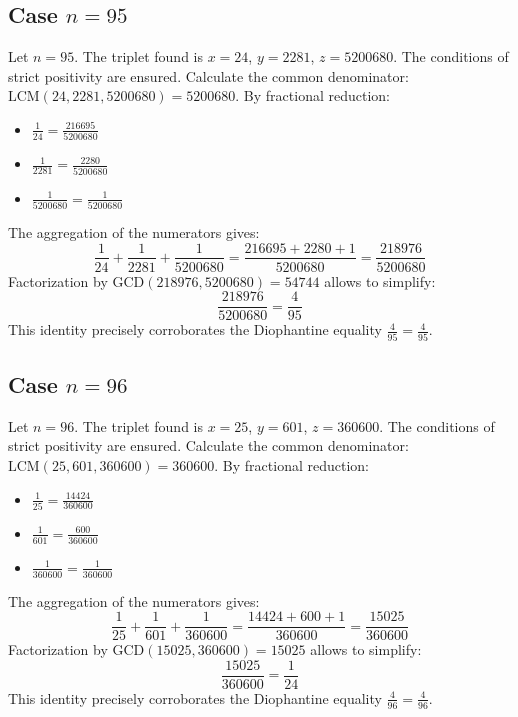 \documentclass[11pt,a4paper]{article}
\begin{document}
\subsection{Case $n = 95$}
Let $n = 95$. The triplet found is $x = 24$, $y = 2281$, $z = 5200680$.
The conditions of strict positivity are ensured.
Calculate the common denominator: $\text{LCM}(24, 2281, 5200680) = 5200680$.
By fractional reduction:
\begin{itemize}
    \item $\frac{1}{24} = \frac{216695}{5200680}$
    \item $\frac{1}{2281} = \frac{2280}{5200680}$
    \item $\frac{1}{5200680} = \frac{1}{5200680}$
\end{itemize}
The aggregation of the numerators gives:
$$ \frac{1}{24} + \frac{1}{2281} + \frac{1}{5200680} = \frac{216695 + 2280 + 1}{5200680} = \frac{218976}{5200680} $$
Factorization by $\text{GCD}(218976, 5200680) = 54744$ allows to simplify:
$$ \frac{218976}{5200680} = \frac{4}{95} $$
This identity precisely corroborates the Diophantine equality $\frac{4}{95} = \frac{4}{95}$.

\subsection{Case $n = 96$}
Let $n = 96$. The triplet found is $x = 25$, $y = 601$, $z = 360600$.
The conditions of strict positivity are ensured.
Calculate the common denominator: $\text{LCM}(25, 601, 360600) = 360600$.
By fractional reduction:
\begin{itemize}
    \item $\frac{1}{25} = \frac{14424}{360600}$
    \item $\frac{1}{601} = \frac{600}{360600}$
    \item $\frac{1}{360600} = \frac{1}{360600}$
\end{itemize}
The aggregation of the numerators gives:
$$ \frac{1}{25} + \frac{1}{601} + \frac{1}{360600} = \frac{14424 + 600 + 1}{360600} = \frac{15025}{360600} $$
Factorization by $\text{GCD}(15025, 360600) = 15025$ allows to simplify:
$$ \frac{15025}{360600} = \frac{1}{24} $$
This identity precisely corroborates the Diophantine equality $\frac{4}{96} = \frac{4}{96}$.
\end{document}
